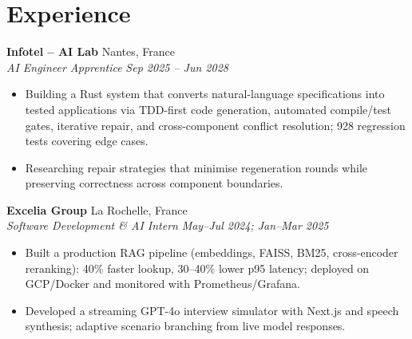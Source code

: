 \documentclass[10pt,a4paper]{article}
\newcommand{\entry}[4]{\textbf{#1} \hfill #2\\\textit{#3} \hfill \textit{#4}\par\vspace{1pt}}
\begin{document}
\section*{Experience}
\entry{Infotel -- AI Lab}{Nantes, France}{AI Engineer Apprentice}{Sep 2025 -- Jun 2028}
\begin{itemize}
\item Building a Rust system that converts natural-language specifications into tested applications via TDD-first code generation, automated compile/test gates, iterative repair, and cross-component conflict resolution; 928 regression tests covering edge cases.
\item Researching repair strategies that minimise regeneration rounds while preserving correctness across component boundaries.
\end{itemize}
\entry{Excelia Group}{La Rochelle, France}{Software Development \& AI Intern}{May--Jul 2024; Jan--Mar 2025}
\begin{itemize}
\item Built a production RAG pipeline (embeddings, FAISS, BM25, cross-encoder reranking): 40\% faster lookup, 30--40\% lower p95 latency; deployed on GCP/Docker and monitored with Prometheus/Grafana.
\item Developed a streaming GPT-4o interview simulator with Next.js and speech synthesis; adaptive scenario branching from live model responses.
\end{itemize}
\end{document}
